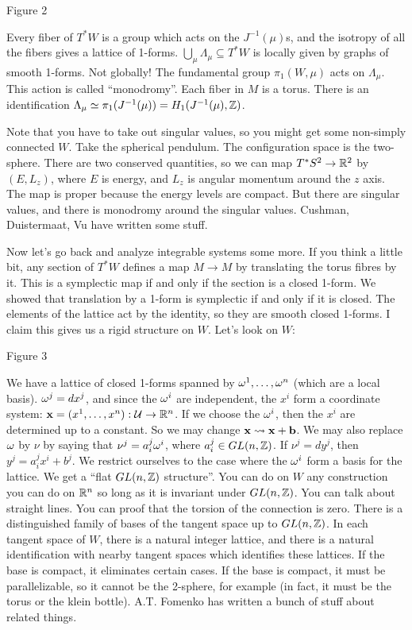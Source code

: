 Figure 2

Every fiber of $T^*W$ is a group which acts on the $J^{-1}(\mu)$s, and the isotropy of
all the fibers gives a lattice of 1-forms.  $\bigcup_\mu \Lambda_\mu\subseteq T^*W$ is
locally given by graphs of smooth 1-forms.  Not globally!  The fundamental group
$\pi_1(W,\mu)$ acts on $\Lambda_\mu$.  This action is called ``monodromy''.  Each
fiber in $M$ is a torus.  There is an identification $\Lambda_\mu \simeq
\pi_1(J^{-1}(\mu)) = H_1(J^{-1}(\mu),\mathbb{Z})$.

Note that you have to take out singular values, so you might get some non-simply
connected $W$.  Take the spherical pendulum.  The configuration space is the
two-sphere.  There are two conserved quantities, so we can map $T^*S^2\to \mathbb{R}^2$ by
$(E,L_z)$, where $E$ is energy, and $L_z$ is angular momentum around the $z$ axis. The
map is proper because the energy levels are compact.  But there are singular values,
and there is monodromy around the singular values.  Cushman, Duistermaat, Vu have
written some stuff.

Now let's go back and analyze integrable systems some more.  If you think a little
bit, any section of $T^*W$ defines a map $M\to M$ by translating the torus fibres by
it.  This is a symplectic map if and only if the section is a closed 1-form.  We
showed that translation by a 1-form is symplectic if and only if it is closed.  The
elements of the lattice act by the identity, so they are smooth closed 1-forms.  I
claim this gives us a rigid structure on $W$.  Let's look on $W$:

Figure 3

\def\x{{\bf{x}}}

We have a lattice of closed 1-forms spanned by $\omega^1,\dots, \omega^n$ (which are a local
basis).  $\omega^j=dx^j$, and since the $\omega^i$ are independent, the $x^i$ form a
coordinate system: $\x =(x^1,\dots, x^n):\U\to \RR^n$.  If we choose the $\omega^i$, then
the $x^i$ are determined up to a constant.  So we may change $\x\rightsquigarrow
\x+{\bf b}$.  We may also replace $\omega$ by $\nu$ by saying that $\nu^j=a^j_i \omega^i$,
where $a_i^j\in GL(n,\mathbb{Z})$.  If $\nu^j=dy^j$, then $y^j=a_i^jx^i+b^j$.  We restrict
ourselves to the case where the $\omega^i$ form a basis for the lattice.  We get a ``flat
$GL(n,\mathbb{Z})$ structure''.  You can do on $W$ any construction you can do on $\mathbb{R}^n$ so
long as it is invariant under $GL(n,\mathbb{Z})$.  You can talk about straight lines.  You
can proof that the torsion of the connection is zero.  There is a distinguished family
of bases of the tangent space up to $GL(n,\mathbb{Z})$.  In each tangent space of $W$, there
is a natural integer lattice, and there is a natural identification with nearby
tangent spaces which identifies these lattices.  If the base is compact, it eliminates
certain cases.  If the base is compact, it must be parallelizable, so it cannot be the
2-sphere, for example (in fact, it must be the torus or the klein bottle).  A.T.
Fomenko has written a bunch of stuff about related things.

